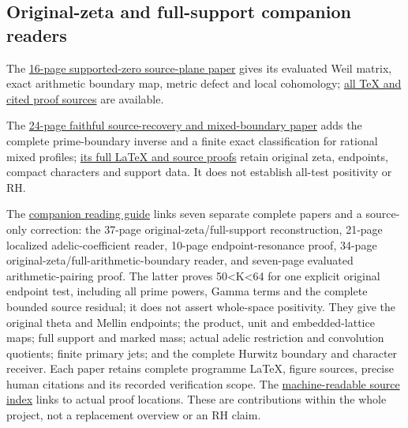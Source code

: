 \documentclass[
]{article}
\begin{document}
\subsection{Original-zeta and full-support companion
readers}\label{original-zeta-and-full-support-companion-readers}

The
\href{https://github.com/KokunoYumeto/zeta-function-research-reader/blob/main/workbenches/splitzero-tandem/continuations/20260923-retained-source-readers/two-source-supported-zero/NOTE.pdf}{16-page
supported-zero source-plane paper} gives its evaluated Weil matrix,
exact arithmetic boundary map, metric defect and local cohomology;
\href{https://github.com/KokunoYumeto/zeta-function-research-reader/blob/main/workbenches/splitzero-tandem/continuations/20260923-retained-source-readers/two-source-supported-zero/PUBLICATION_READING.md}{all
TeX and cited proof sources} are available.

The
\href{https://github.com/KokunoYumeto/zeta-function-research-reader/blob/main/workbenches/splitzero-tandem/continuations/20260923-retained-source-readers/adelic-boundary-recovery/ADELIC_BOUNDARY_RECOVERY_READER.pdf}{24-page
faithful source-recovery and mixed-boundary paper} adds the complete
prime-boundary inverse and a finite exact classification for rational
mixed profiles;
\href{https://github.com/KokunoYumeto/zeta-function-research-reader/blob/main/workbenches/splitzero-tandem/continuations/20260923-retained-source-readers/adelic-boundary-recovery/ADELIC_BOUNDARY_RECOVERY_READER.tex}{its
full LaTeX and source proofs} retain original zeta, endpoints, compact
characters and support data. It does not establish all-test positivity
or RH.

The
\href{https://github.com/KokunoYumeto/zeta-function-research-reader/blob/main/workbenches/splitzero-tandem/continuations/20260923-retained-source-readers/README.md}{companion
reading guide} links seven separate complete papers and a source-only
correction: the 37-page original-zeta/full-support reconstruction,
21-page localized adelic-coefficient reader, 10-page endpoint-resonance
proof, 34-page original-zeta/full-arithmetic-boundary reader, and
seven-page evaluated arithmetic-pairing proof. The latter proves
50\textless K\textless64 for one explicit original endpoint test,
including all prime powers, Gamma terms and the complete bounded source
residual; it does not assert whole-space positivity. They give the
original theta and Mellin endpoints; the product, unit and
embedded-lattice maps; full support and marked mass; actual adelic
restriction and convolution quotients; finite primary jets; and the
complete Hurwitz boundary and character receiver. Each paper retains
complete programme LaTeX, figure sources, precise human citations and
its recorded verification scope. The
\href{https://github.com/KokunoYumeto/zeta-function-research-reader/blob/main/workbenches/splitzero-tandem/continuations/20260923-retained-source-readers/PUBLIC_SOURCE_INDEX.json}{machine-readable
source index} links to actual proof locations. These are contributions
within the whole project, not a replacement overview or an RH claim.
\end{document}
